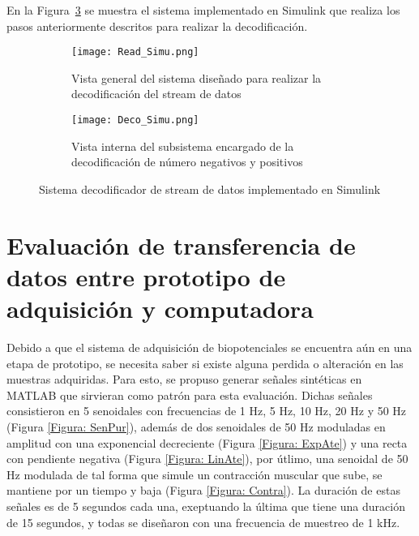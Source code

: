 En la Figura~\ref{Figura: DecoSimuT} se muestra el sistema implementado en Simulink que realiza los pasos anteriormente descritos para realizar la decodificación.

\begin{figure}[htbp]
	\centering
	\begin{subfigure}[htbp]{0.5\textwidth}
		\texttt{[image: Read\_Simu.png]}
		\caption{Vista general del sistema diseñado para realizar la decodificación del stream de datos}
		\label{Figura: readSimu}
	\end{subfigure}
	\begin{subfigure}[htbp]{0.5\textwidth}
		\texttt{[image: Deco\_Simu.png]}
		\caption{Vista interna del subsistema encargado de la decodificación de número negativos y positivos}
		\label{Figura: decoSimu}
	\end{subfigure}
	\caption{Sistema decodificador de stream de datos implementado en Simulink}
	\label{Figura: DecoSimuT}
\end{figure}

\newpage
\section{Evaluación de transferencia de datos entre prototipo de adquisición y computadora}
Debido a que el sistema de adquisición de biopotenciales se encuentra aún en una etapa de prototipo, se necesita saber si existe alguna perdida o alteración en las muestras adquiridas. Para esto, se propuso generar señales sintéticas en MATLAB que sirvieran como patrón para esta evaluación. Dichas señales consistieron en 5 senoidales con frecuencias de 1 Hz, 5 Hz, 10 Hz, 20 Hz y 50 Hz (Figura \ref{Figura: SenPur}), además de dos senoidales de 50 Hz moduladas en amplitud con una exponencial decreciente (Figura \ref{Figura: ExpAte}) y una recta con pendiente negativa (Figura \ref{Figura: LinAte}), por útlimo, una senoidal de 50 Hz modulada de tal forma que simule un contracción muscular que sube, se mantiene por un tiempo y baja (Figura \ref{Figura: Contra}). La duración de estas señales es de 5 segundos cada una, exeptuando la última que tiene una duración de 15 segundos, y todas se diseñaron con una frecuencia de muestreo de 1 kHz.

